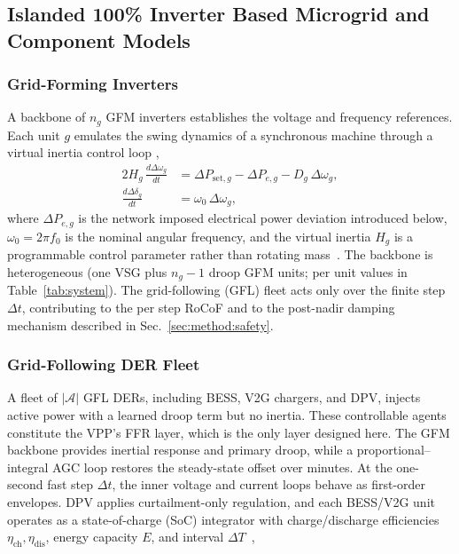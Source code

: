 \documentclass[lettersize,journal]{IEEEtran}
\begin{document}
	\subsection{Islanded 100\% Inverter Based Microgrid and Component Models}
	\label{sec:model:overview}
	\subsubsection{Grid-Forming Inverters}
	A backbone of $n_g$ GFM inverters establishes the voltage and frequency references. Each unit $g$ emulates the swing dynamics of a synchronous machine through a virtual inertia control loop \cite{hou2020adaptive},
	\begin{align}
		2H_g\,\frac{d\Delta\omega_g}{dt}
		&= \Delta P_{\mathrm{set},g}-\Delta P_{e,g}-D_g\,\Delta\omega_g,
		\label{eq:vsg_swing}\\
		\frac{d\Delta\delta_g}{dt} &= \omega_0\,\Delta\omega_g,
		\label{eq:vsg_angle}
	\end{align}
	where $\Delta P_{e,g}$ is the network imposed electrical power deviation introduced below, $\omega_0=2\pi f_0$ is the nominal angular frequency, and the virtual inertia $H_g$ is a programmable control parameter rather than rotating mass~\cite{10638828}. The backbone is heterogeneous (one VSG plus $n_g-1$ droop GFM units; per unit values in Table~\ref{tab:system}). The grid-following (GFL) fleet acts only over the finite step $\Delta t$, contributing to the per step RoCoF and to the post-nadir damping mechanism described in
	Sec.~\ref{sec:method:safety}.
	
	\subsubsection{Grid-Following DER Fleet}
	A fleet of $|\mathcal{A}|$ GFL DERs, including BESS, V2G chargers, and DPV, injects active power with a learned droop term but no inertia. These controllable agents constitute the VPP’s FFR layer, which is the only layer designed here. The GFM backbone provides inertial response and primary droop, while a proportional–integral AGC loop restores the steady-state offset over minutes. At the one-second fast step $\Delta t$, the inner voltage and current loops behave as first-order envelopes. DPV applies curtailment-only regulation, and each BESS/V2G unit operates as a state-of-charge (SoC) integrator with charge/discharge efficiencies $\eta_{\mathrm{ch}}, \eta_{\mathrm{dis}}$, energy capacity $E$, and interval $\Delta T$~\cite{alden2026vppev},
	
\end{document}
